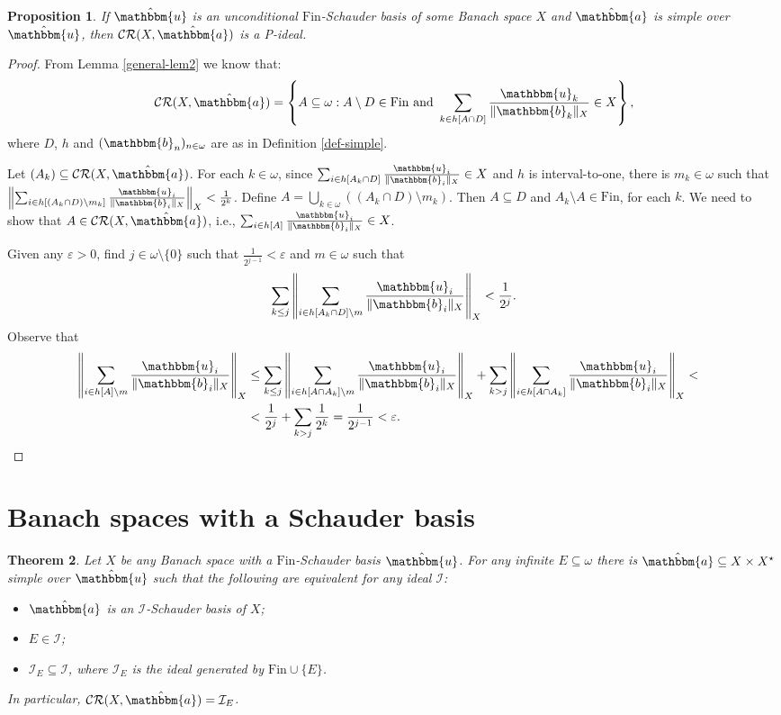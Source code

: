 \documentclass[10pt,a4paper]{amsart}
\newcommand{\I}{\mathcal{I}}
\newcommand{\Fin}{\mathrm{Fin}}
\newcommand{\CR}{\mathcal{CR}}
\newcommand{\w}{\mathbbm}
\newtheorem{theorem}{Theorem}[section]
\newtheorem{proposition}[theorem]{Proposition}
\begin{document}
\begin{proposition}
\label{general-P-ideal}
If $\hat{\w{u}}$ is an unconditional $\Fin$-Schauder basis of some Banach space $X$ and $\hat{\w{a}}$ is simple over $\hat{\w{u}}$, then $\CR(X,\hat{\w{a}})$ is a P-ideal.
\end{proposition}

\begin{proof}
From Lemma \ref{general-lem2} we know that:
\[
\CR(X,\hat{\w{a}})=\left\{A\subseteq\omega: A\setminus D\in\Fin\text{ and }\sum_{k\in h[A\cap D]}\frac{\w{u}_{k}}{\|\w{b}_{k}\|_X}\in X\right\},
\]
where $D$, $h$ and $(\w{b}_n)_{n\in\omega}$ are as in Definition \ref{def-simple}. 

Let $(A_k)\subseteq \CR(X,\hat{\w{a}})$. For each $k\in\omega$, since $\sum_{i\in h[A_k\cap D]}\frac{\w{u}_{i}}{\|\w{b}_{i}\|_X}\in X$ and $h$ is interval-to-one, there is $m_k\in\omega$ such that $\left\|\sum_{i\in h[(A_k\cap D)\setminus m_k]}\frac{\w{u}_{i}}{\|\w{b}_{i}\|_X}\right\|_X<\frac{1}{2^k}$. Define $A=\bigcup_{k\in\omega}((A_k\cap D)\setminus m_k)$. Then $A\subseteq D$ and $A_k\setminus A\in\Fin$, for each $k$. We need to show that $A\in\CR(X,\hat{\w{a}})$, i.e., $\sum_{i\in h[A]}\frac{\w{u}_{i}}{\|\w{b}_{i}\|_X}\in X$. 

Given any $\varepsilon>0$, find $j\in\omega\setminus\{0\}$ such that $\frac{1}{2^{j-1}}<\varepsilon$ and $m\in\omega$ such that 
\[
\sum_{k\leq j}\left\|\sum_{i\in h[A_k\cap D]\setminus m}\frac{\w{u}_{i}}{\|\w{b}_{i}\|_X}\right\|_X<\frac{1}{2^{j}}.
\]
Observe that
\begin{align*}
    \left\|\sum_{i\in h[A]\setminus m}\frac{\w{u}_{i}}{\|\w{b}_{i}\|_X}\right\|_X & \leq\sum_{k\leq j}\left\|\sum_{i\in h[A\cap A_k]\setminus m}\frac{\w{u}_{i}}{\|\w{b}_{i}\|_X}\right\|_X+\sum_{k>j}\left\|\sum_{i\in h[A\cap A_k]}\frac{\w{u}_{i}}{\|\w{b}_{i}\|_X}\right\|_X< \cr
    & <\frac{1}{2^{j}}+\sum_{k>j}\frac{1}{2^k}=\frac{1}{2^{j-1}}<\varepsilon.
\end{align*}
\end{proof}



\section{Banach spaces with a Schauder basis}


\begin{theorem}
\label{thm-distinguishing}
Let $X$ be any Banach space with a $\Fin$-Schauder basis $\hat{\w{u}}$. For any infinite $E\subseteq\omega$ there is $\hat{\w{a}}\subseteq X\times X^\star$ simple over $\hat{\w{u}}$ such that the following are equivalent for any ideal $\I$:
\begin{itemize}
    \item[(a)] $\hat{\w{a}}$ is an $\I$-Schauder basis of $X$;
    \item[(b)] $E\in\I$;
    \item[(c)] $\I_E\subseteq\I$, where $\I_E$ is the ideal generated by $\Fin\cup\{E\}$.
\end{itemize}
In particular, $\CR(X,\hat{\w{a}})=\I_E$.
\end{theorem}
\end{document}
